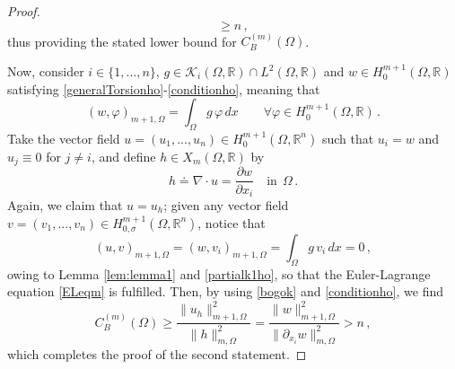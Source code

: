 \documentclass[11pt]{article}
\theoremstyle{plain}
\theoremstyle{definition}
\numberwithin{equation}{section}
\begin{document}
\begin{proof}
$$	\ge n\, ,
	$$
	thus providing the stated lower bound for $C_B^{(m)}(\Omega)$.\par
	Now, consider $i \in \{1,...,n\}$, $g\in\mathcal{K}_{i}(\Omega, \mathbb{R}) \cap L^{2}(\Omega, \mathbb{R})$ and $w\in H^{m+1}_{0}(\Omega, \mathbb{R})$ satisfying \eqref{generalTorsionho}-\eqref{conditionho}, meaning  that
	\begin{equation}\label{partialk1ho}
		(w, \varphi)_{m+1,\Omega} = \int_\Omega g \, \varphi \, dx\qquad \forall \varphi \in H^{m+1}_{0}(\Omega, \mathbb{R}) \, .
	\end{equation}
	Take the vector field
	$u=(u_1,...,u_n)\in H^{m+1}_{0}(\Omega, \mathbb{R}^{n})$ such that $u_i=w$ and $u_j\equiv0$ for $j \neq i$, and define $h \in X_{m}(\Omega, \mathbb{R})$ by
	$$
	h\doteq\nabla\cdot u=\dfrac{\partial w}{\partial x_{i}} \quad \text{in} \ \ \Omega \, .
	$$
	Again, we claim that $u = u_h$; given any vector field $v = (v_{1},...,v_{n}) \in H^{m+1}_{0, \sigma}(\Omega, \mathbb{R}^{n})$, notice that
	$$
	(u, v)_{m+1,\Omega} = (w, v_{i})_{m+1,\Omega} = \int_{\Omega} g \, v_{i}\, dx = 0 \, ,
	$$
	owing to Lemma \ref{lem:lemma1} and \eqref{partialk1ho}, so that the Euler-Lagrange equation \eqref{ELeqm} is fulfilled. Then, by using \eqref{bogok} and \eqref{conditionho}, we find
	$$
	C_B^{(m)}(\Omega) \ge \frac{\|u_h\|_{m+1, \Omega}^{2}}{\|h\|_{m, \Omega}^{2}}=\frac{\|w\|_{m+1, \Omega}^{2}}{\|\partial_{x_i} w\|_{m, \Omega}^{2}}>n\, ,
	$$
	which completes the proof of the second statement.
\end{proof}
\end{document}
